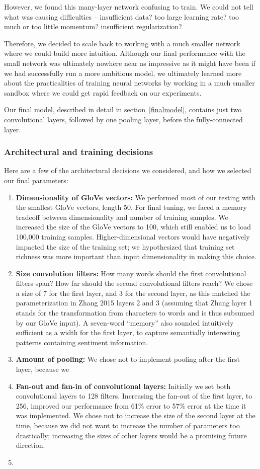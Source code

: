 \documentclass{article}
\begin{document}
However, we found this many-layer network confusing to train. We could not tell what was causing difficulties -- insufficient data? too large learning rate? too much or too little momentum? insufficient regularization?

Therefore, we decided to scale back to working with a much smaller network where we could build more intuition. Although our final performance with the small network was ultimately nowhere near as impressive as it might have been if we had successfully run a more ambitious model, we ultimately learned more about the practicalities of training neural networks by working in a much smaller sandbox where we could get rapid feedback on our experiments.

Our final model, described in detail in section~\ref{finalmodel}, contains just two convolutional layers, followed by one pooling layer, before the fully-connected layer.

\subsubsection*{Architectural and training decisions}

Here are a few of the architectural decisions we considered, and how we selected our final parameters:
\begin{enumerate}
\item{\textbf{Dimensionality of GloVe vectors:}} We performed most of our testing with the smallest GloVe vectors, length 50. For final tuning, we faced a memory tradeoff between dimensionality and number of training samples. We increased the size of the GloVe vectors to 100, which still enabled us to load 100,000 training samples. Higher-dimensional vectors would have negatively impacted the size of the training set; we hypothesized that training set richness was more important than input dimensionality in making this choice.
\item{\textbf{Size convolution filters:}} How many words should the first convolutional filters span? How far should the second convolutional filters reach? We chose a size of 7 for the first layer, and 3 for the second layer, as this matched the parameterization in Zhang 2015 layers 2 and 3 (assuming that Zhang layer 1 stands for the transformation from characters to words and is thus subsumed by our GloVe input). A seven-word ``memory'' also sounded intuitively sufficient as a width for the first layer, to capture semantially interesting patterns containing sentiment information.
\item{\textbf{Amount of pooling:}} We chose not to implement pooling after the first layer, because we 
\item{\textbf{Fan-out and fan-in of convolutional layers:}} Initially we set both convolutional layers to 128 filters. Increasing the fan-out of the first layer, to 256, improved our performance from 61\% error to 57\% error at the time it was implemented. We chose not to increase the size of the second layer at the time, because we did not want to increase the number of parameters too drastically; increasing the sizes of other layers would be a promising future direction.
\item{}
\end{enumerate}
\end{document}
